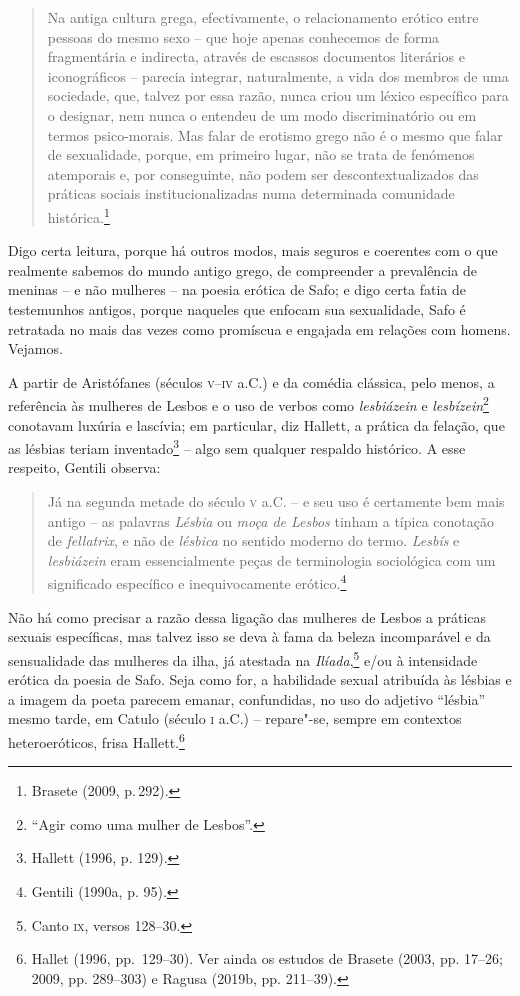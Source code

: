 \begin{quote}
Na antiga cultura grega, efectivamente, o relacionamento erótico entre pessoas do mesmo sexo – que hoje apenas conhecemos de forma fragmentária e indirecta, através de escassos documentos literários e iconográficos – parecia integrar, naturalmente, a vida dos membros de uma sociedade, que, talvez por essa razão, nunca criou um léxico específico para o designar, nem nunca o entendeu de um modo discriminatório ou em termos psico-morais. Mas falar de erotismo grego não é o mesmo que falar de sexualidade, porque, em primeiro lugar, não se trata de fenómenos atemporais e, por conseguinte, não podem ser descontextualizados das práticas sociais institucionalizadas numa determinada comunidade histórica.\footnote{Brasete (2009, p.\,292).}
\end{quote}


\noindent{}Digo certa leitura, porque há outros modos, mais
seguros e coerentes com o que realmente sabemos do mundo antigo grego, de
compreender a prevalência de meninas -- e não mulheres --  na poesia erótica de Safo; e digo
certa fatia de testemunhos antigos, porque naqueles que enfocam sua
sexualidade, Safo é retratada no mais das vezes como promíscua e engajada em relações com homens. Vejamos. 

A partir de Aristófanes (séculos \textsc{v}--\textsc{iv} a.C.) e da comédia clássica, pelo menos, a
referência às mulheres de Lesbos e o uso de verbos como \textit{lesbiázein} e
\textit{lesbízein}\footnote{``Agir como uma mulher de Lesbos''.} conotavam luxúria e
lascívia; em particular, diz Hallett, a prática da
felação, que as lésbias teriam inventado\footnote{ Hallett (1996, p. 129).} -- algo sem qualquer respaldo
histórico. A esse respeito, Gentili observa: 

\begin{quote}
Já na segunda metade do século \textsc{v} a.C. -- e seu uso é certamente bem mais antigo
-- as palavras \textit{Lésbia} ou \textit{moça de Lesbos} tinham a típica
conotação de \textit{fellatrix}, e não de \textit{lésbica} no sentido moderno
do termo. \textit{Lesbís} e \textit{lesbiázein} eram essencialmente peças de
terminologia sociológica com um significado específico e inequivocamente
erótico.\footnote{ Gentili (1990a, p. 95).}
\end{quote}

Não há como precisar a razão dessa ligação das mulheres de Lesbos a práticas
sexuais específicas, mas talvez isso se deva à fama da beleza incomparável e da
sensualidade das mulheres da ilha, já atestada na \textit{Ilíada},\footnote{Canto \textsc{ix}, versos 128--30.}
e/ou à intensidade erótica da poesia de Safo. Seja como for, a habilidade
sexual atribuída às lésbias e a imagem da poeta parecem
emanar, confundidas, no uso do adjetivo “lésbia” mesmo tarde, em Catulo
(século \textsc{i} a.C.) -- repare"-se, sempre em contextos heteroeróticos, frisa Hallett.\footnote{ Hallet 
(1996, pp.~129--30). Ver ainda os estudos de Brasete (2003, pp. 17--26; 2009, pp. 289--303) e Ragusa (2019b, pp. 211--39).} 

